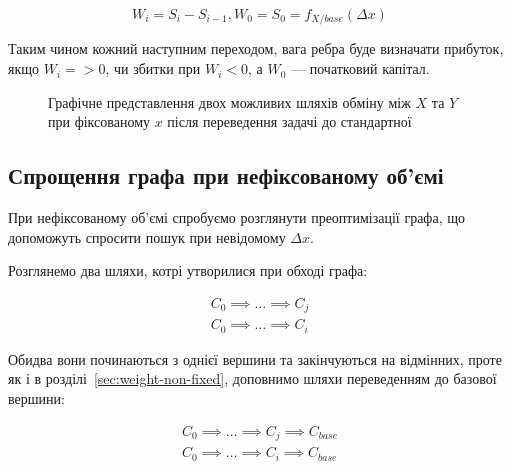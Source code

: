 \documentclass[../index.tex]{subfiles}
\begin{document}
\begin{equation*}
W_{i} = S_{i} - S_{i-1}, W_{0} = S_{0} = f_{X/base}(\Delta x)
\end{equation*}

Таким чином кожний наступним переходом, вага ребра буде визначати прибуток, якщо
$W_{i} => 0$, чи збитки при $W_{i} < 0$, а $W_{0}$ --- початковий капітал.

\begin{figure}[h]
	\centering
	\caption{\label{fig:eval-func-graph-weight} Графічне представлення двох
	  можливих шляхів обміну між $X$ та $Y$ при фіксованому $x$ після
	  переведення задачі до стандартної}
\end{figure}

\subsection{Спрощення графа при нефіксованому об'ємі}

При нефіксованому об'ємі спробуємо розглянути преоптимізації графа, що
допоможуть спросити пошук при невідомому $\Delta x$.

Розглянемо два шляхи, котрі утворилися при обході графа:

\begin{equation*}
 \begin{aligned}
   C_{0} \implies \ldots \implies C_{j} \\
   C_{0} \implies \ldots \implies C_{i}
 \end{aligned}
\end{equation*}

Обидва вони починаються з однієї вершини та закінчуються на відмінних, проте як
і в розділі~\ref{sec:weight-non-fixed}, доповнимо шляхи переведенням до базової
вершини:

\begin{equation*}
 \begin{aligned}
   C_{0} \implies \ldots \implies C_{j} \implies C_{base}\\
   C_{0} \implies \ldots \implies C_{i} \implies C_{base}
 \end{aligned}
\end{equation*}
\end{document}
